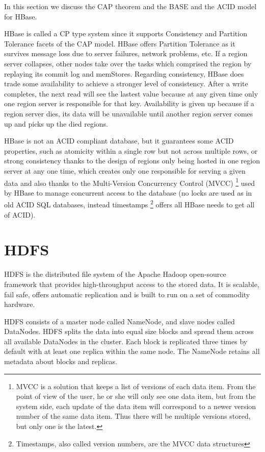 In this section we discuss the CAP theorem and the BASE and the ACID model for HBase. 
\par
HBase is called a CP type system since it supports Consistency and Partition Tolerance facets of the CAP model.
HBase offers Partition Tolerance as it survives message loss due to server failures, network problems, etc. If a region server collapses, other nodes take over the tasks which comprised the region by replaying its commit log and memStores.
Regarding consistency, HBase does trade some availability to achieve a stronger level of consistency. After a write completes, the next read will see the lastest value because at any given time only one region server is responsible for that key.
Availability is given up because if a region server dies, its data will be unavailable until another region server comes up and picks up the died regions.
\par
HBase is not an ACID compliant database, but it guarantees some ACID properties, such as atomicity within a single row but not across multiple rows, or strong consistency thanks to the design of regions only being hosted in one region server at any one time, which creates only one responsible for serving a given data and also thanks to the Multi-Version Concurrency Control (MVCC) \footnote{MVCC \cite{bernstein1983multiversion} is a solution that keeps a list of versions of each data item. From the point of view of the user, he or she will only see one data item, but from the system side, each update of the data item will correspond to a newer version number of the same data item. Thus there will be multiple versions stored, but only one is the latest.} used by HBase to manage concurrent access to the database (no locks are used as in old ACID SQL databases, instead timestamps \footnote{Timestamps, also called version numbers, are the MVCC data structures} offers all HBase needs to get all of ACID).



\section{HDFS}
HDFS is the distributed file system of the Apache Hadoop open-source framework that provides high-throughput access to the stored data. It is scalable, fail safe, offers automatic replication and is built to run on a set of commodity hardware.
\par
HDFS consists of a master node called NameNode, and slave nodes called DataNodes. HDFS splits the data into equal size blocks and spread them across all available DataNodes in the cluster. Each block is replicated three times by default with at least one replica within the same node. The NameNode retains all metadata about blocks and replicas.

